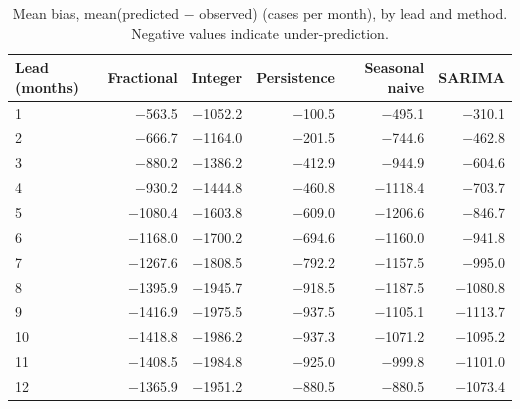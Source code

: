\begin{table}[htbp]
\centering
\small
\caption{Mean bias, mean(predicted $-$ observed) (cases per month), by lead and method. Negative values indicate under-prediction.}
\label{tab:bias_h}
\begingroup\setlength{\tabcolsep}{6pt}
\begin{tabular}{@{}lrrrrr@{}}
\toprule
Lead (months) & Fractional & Integer & Persistence & Seasonal naive & SARIMA \\
\midrule
1 & $-$563.5 & $-$1052.2 & $-$100.5 & $-$495.1 & $-$310.1 \\
2 & $-$666.7 & $-$1164.0 & $-$201.5 & $-$744.6 & $-$462.8 \\
3 & $-$880.2 & $-$1386.2 & $-$412.9 & $-$944.9 & $-$604.6 \\
4 & $-$930.2 & $-$1444.8 & $-$460.8 & $-$1118.4 & $-$703.7 \\
5 & $-$1080.4 & $-$1603.8 & $-$609.0 & $-$1206.6 & $-$846.7 \\
6 & $-$1168.0 & $-$1700.2 & $-$694.6 & $-$1160.0 & $-$941.8 \\
7 & $-$1267.6 & $-$1808.5 & $-$792.2 & $-$1157.5 & $-$995.0 \\
8 & $-$1395.9 & $-$1945.7 & $-$918.5 & $-$1187.5 & $-$1080.8 \\
9 & $-$1416.9 & $-$1975.5 & $-$937.5 & $-$1105.1 & $-$1113.7 \\
10 & $-$1418.8 & $-$1986.2 & $-$937.3 & $-$1071.2 & $-$1095.2 \\
11 & $-$1408.5 & $-$1984.8 & $-$925.0 & $-$999.8 & $-$1101.0 \\
12 & $-$1365.9 & $-$1951.2 & $-$880.5 & $-$880.5 & $-$1073.4 \\
\bottomrule
\end{tabular}
\endgroup
\end{table}
